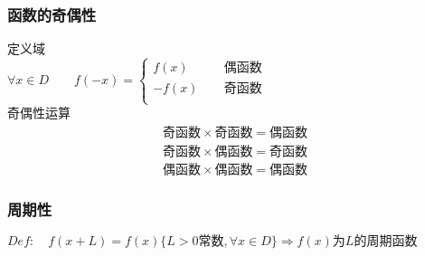  \subsubsection{函数的奇偶性}
 定义域\\ 
 \bigskip
 $\forall x\in D\qquad f(-x)=\begin{cases}
    f(x)\qquad &\mbox{偶函数}\\
    -f(x) &\mbox{奇函数}\\
 \end{cases}$\\
 \bigskip
 奇偶性运算
\begin{align}
    \mbox{奇函数}\times \mbox{奇函数}=\mbox{偶函数}\\
    \mbox{奇函数}\times \mbox{偶函数}=\mbox{奇函数}\\
    \mbox{偶函数}\times \mbox{偶函数}=\mbox{偶函数}
 \end{align}
 \subsubsection{周期性}
 $Def:\quad f(x+L)=f(x) \{L>0\mbox{常数},\forall x\in D\}\Rightarrow \mbox{$f(x)$为$L$的周期函数}$
